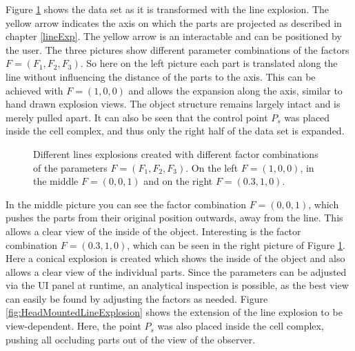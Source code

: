 Figure \ref{fig:LineExplosionPictures} shows the data set as it is transformed with the line explosion. The yellow arrow indicates the axis on which the parts are projected as described in chapter \ref{lineExp}. 
The yellow arrow is an interactable and can be positioned by the user. 
The three pictures show different parameter combinations of the factors $F=(F_1, F_2, F_3)$. So here on the left picture each part is translated along the line without influencing the distance of the parts to the axis.  
This can be achieved with $F=(1,0,0)$ and allows the expansion along the axis, similar to hand drawn explosion views. The object structure remains largely intact and is merely pulled apart. It can also be seen that the control point $P_s$ was placed inside the cell complex, and thus only the right half of the data set is expanded. 
\begin{figure}[t]
	\noindent{}
	\caption[]{Different lines explosions created with different factor combinations of the parameters $F=(F_1, F_2, F_3)$. On the left $F=(1,0,0)$, in the middle $F=(0, 0, 1)$ and on the right $F=(0.3, 1, 0)$.}
	\label{fig:LineExplosionPictures}
\end{figure}
In the middle picture you can see the factor combination $F=(0, 0, 1)$, which pushes the parts from their original position outwards, away from the line. 
This allows a clear view of the inside of the object. 
Interesting is the factor combination $F=(0.3, 1, 0)$, which can be seen in the right picture of Figure \ref{fig:LineExplosionPictures}. Here a conical explosion is created which shows the inside of the object and also allows a clear view of the individual parts.  
Since the parameters can be adjusted via the UI panel at runtime, an analytical inspection is possible, as the best view can easily be found by adjusting the factors as needed.   
Figure \ref{fig:HeadMountedLineExplosion} shows the extension of the line explosion to be view-dependent. Here, the point $P_s$ was also placed inside the cell complex, pushing all occluding parts out of the view of the observer. 
